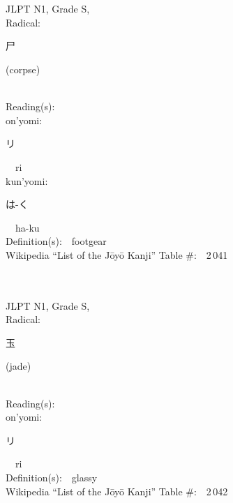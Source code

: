 \begin{multicols}{2}
\ \ \\
{\fontsize{34pt}{40pt}  }\ \ \\
{JLPT N1, Grade S, \\Radical:\ \ {\begin{CJK}{UTF8}{min} 尸 \end{CJK}} (corpse) } \\
Reading(s):\ \ \\
{\hspace*{1em}}on'yomi:\ \ \\
{\hspace*{2em}}{\begin{CJK}{UTF8}{min} リ \end{CJK}}\ \ ri\ \ \\
{\hspace*{1em}}kun'yomi:\ \ \\
{\hspace*{2em}}{\begin{CJK}{UTF8}{min} は-く \end{CJK}}\ \ ha-ku\ \ \\
Definition(s):\ \ footgear \\
Wikipedia ``List of the J\=oy\=o Kanji'' Table \#:\ \ 2\,041 \\
\ \ \\
{\fontsize{34pt}{40pt}  }\ \ \\
{JLPT N1, Grade S, \\Radical:\ \ {\begin{CJK}{UTF8}{min} 玉 \end{CJK}} (jade) } \\
Reading(s):\ \ \\
{\hspace*{1em}}on'yomi:\ \ \\
{\hspace*{2em}}{\begin{CJK}{UTF8}{min} リ \end{CJK}}\ \ ri\ \ \\
Definition(s):\ \ glassy \\
Wikipedia ``List of the J\=oy\=o Kanji'' Table \#:\ \ 2\,042 \\
\ \ \\
{\fontsize{34pt}{40pt}  }\ \ \\

\end{multicols}
